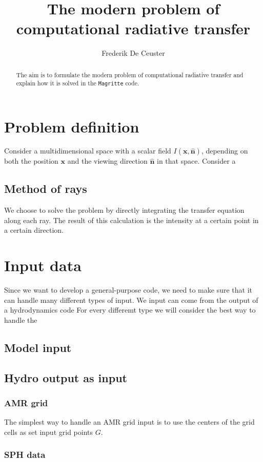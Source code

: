 \documentclass[]{article}
\title{ The modern problem of computational radiative transfer }
\author{ Frederik De Ceuster }
\date{}
\begin{document}
\maketitle

\begin{abstract}
The aim is to formulate the modern problem of computational radiative transfer and explain how it is solved in the \texttt{Magritte} code.
\end{abstract}


\section{Problem definition}

Consider a multidimensional space with a scalar field $I(\textbf{x},\hat{\textbf{n}})$, depending on both the position $\textbf{x}$ and the viewing direction $\hat{\textbf{n}}$ in that space. Consider a

\subsection{Method of rays}

We choose to solve the problem by directly integrating the transfer equation along each ray. The result of this calculation is the intensity at a certain point in a certain direction.


\section{Input data}

Since we want to develop a general-purpose code, we need to make sure that it can handle many different types of input. We input can come from the output of a hydrodynamics code For every differemt type we will consider the best way to handle the

\subsection{Model input}


\subsection{Hydro output as input}

\subsubsection{AMR grid}

The simplest way to handle an AMR grid input is to use the centers of the grid cells as set input grid points $G$.

\subsubsection{SPH data}




\end{document}
